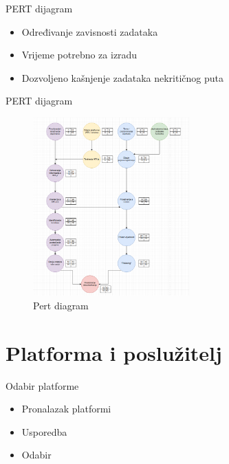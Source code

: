 \documentclass[aspectratio=169,xcolor=dvipsnames]{beamer}
\begin{document}

\begin{frame}{PERT dijagram}
    \begin{itemize}
        \item Određivanje zavisnosti zadataka 
        \item Vrijeme potrebno za izradu
        \item Dozvoljeno kašnjenje zadataka nekritičnog puta
    \end{itemize}
    
\end{frame}

\begin{frame}{PERT dijagram}
    \begin{figure}
        \centering
        \includegraphics[width=6cm]{pert}
        \caption{Pert diagram}
        \label{fig:pert}
    \end{figure}
\end{frame}

\section{Platforma i poslužitelj}

\begin{frame}{Odabir platforme}
    \begin{itemize}
        \item Pronalazak platformi 
        \item Usporedba 
        \item Odabir
    \end{itemize}
\end{frame}

\end{document}

